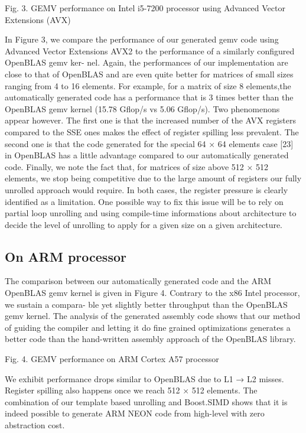 \documentclass[../../main.tex]{subfiles}
\begin{document}
Fig. 3. GEMV performance on Intel i5-7200 processor using Advanced Vector
Extensions (AVX)

In Figure 3, we compare the performance of our generated
gemv code using Advanced Vector Extensions AVX2 to the
performance of a similarly configured OpenBLAS gemv ker-
nel. Again, the performances of our implementation are close
to that of OpenBLAS and are even quite better for matrices of
small sizes ranging from 4 to 16 elements. For example, for a
matrix of size 8 elements,the automatically generated code has
a performance that is 3 times better than the OpenBLAS gemv
kernel (15.78 Gflop/s vs 5.06 Gflop/s). Two phenomenons
appear however. The first one is that the increased number
of the AVX registers compared to the SSE ones makes the
effect of register spilling less prevalent. The second one is
that the code generated for the special 64 × 64 elements
case [23] in OpenBLAS has a little advantage compared to
our automatically generated code. Finally, we note the fact
that, for matrices of size above 512 × 512 elements, we stop
being competitive due to the large amount of registers our
fully unrolled approach would require.
In both cases, the register pressure is clearly identified as a
limitation. One possible way to fix this issue will be to rely
on partial loop unrolling and using compile-time informations
about architecture to decide the level of unrolling to apply for
a given size on a given architecture.

\subsection{On ARM processor}

The comparison between our automatically generated code
and the ARM OpenBLAS gemv kernel is given in Figure 4.
Contrary to the x86 Intel processor, we sustain a compara-
ble yet slightly better throughput than the OpenBLAS gemv
kernel. The analysis of the generated assembly code shows
that our method of guiding the compiler and letting it do
fine grained optimizations generates a better code than the
hand-written assembly approach of the OpenBLAS library.

Fig. 4. GEMV performance on ARM Cortex A57 processor

We exhibit performance drops similar to OpenBLAS due to
L1 → L2 misses. Register spilling also happens once we reach
512 × 512 elements. The combination of our template based
unrolling and Boost.SIMD shows that it is indeed possible to
generate ARM NEON code from high-level \cpp with zero
abstraction cost.
\end{document}

